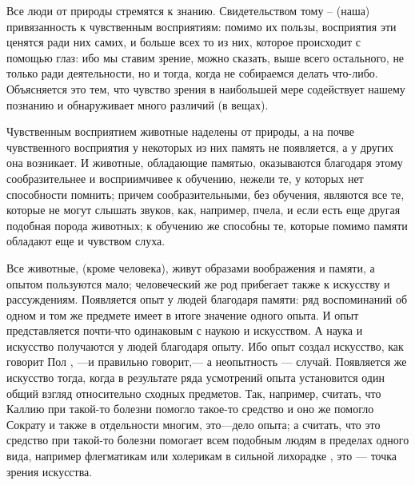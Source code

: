 \documentclass{article}
\begin{document}
Все люди от природы стремятся к знанию. Свидетельством тому -- (наша) привязанность к чувственным восприятиям: помимо их пользы, восприятия эти ценятся ради них самих, и больше всех то из них, которое происходит с помощью глаз: ибо мы ставим зрение, можно сказать, выше всего остального, не только ради деятельности, но и тогда, когда не собираемся делать что-либо. Объясняется это тем, что чувство зрения в наибольшей мере содействует нашему познанию и обнаруживает много различий (в вещах).

Чувственным восприятием животные наделены от природы, а на почве чувственного восприятия у некоторых из них память не появляется, а у других она возникает. И животные, обладающие памятью, оказываются благодаря этому сообразительнее и восприимчивее к обучению, нежели те, у которых нет способности помнить; причем сообразительными, без обучения, являются все те, которые не могут слышать звуков, как, например, пчела, и если есть еще другая подобная порода животных; к обучению же способны те, которые помимо памяти обладают еще и чувством слуха.

Все животные, (кроме человека), живут образами воображения и памяти, а опытом пользуются мало; человеческий же род прибегает также к искусству и рассуждениям. Появляется опыт у людей благодаря памяти: ряд воспоминаний об одном и том же предмете имеет в итоге значение одного опыта. И опыт представляется почти-что одинаковым с наукою и искусством. А наука и искусство получаются у людей благодаря опыту. Ибо опыт создал искусство, как говорит Пол
\footnotemark[1]
, —и правильно говорит,— а неопытность — случай. Появляется же искусство тогда, когда в результате ряда усмотрений опыта установится один общий взгляд относительно сходных предметов. Так, например, считать, что Каллию при такой-то болезни помогло такое-то средство и оно же помогло Сократу и также в отдельности многим, это—дело опыта; а считать, что это средство при такой-то болезни помогает всем подобным людям в пределах одного вида, например флегматикам или холерикам в сильной лихорадке
\footnotemark[2]
, это — точка зрения искусства.
\end{document}
